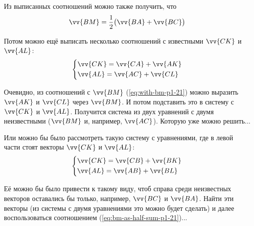 \documentclass[a4paper,12pt]{article}
\begin{document}
\begin{solution}
    Из выписанных соотношений можно также получить, что
    \begin{equation}
      \label{eq:bm-as-half-sum-p1-21}
      \vv{BM} = \frac{1}{2}\bigl(\vv{BA} + \vv{BC}\bigr)
    \end{equation}
    
    Потом можно ещё выписать несколько соотношений с известными $\vv{CK}$ и $\vv{AL}$:
    \begin{equation}
      \label{eq:with-ck-al-p1-21}
      \left\{
        \begin{aligned}
          &\vv{CK} = \vv{CA} + \vv{AK}\\
          &\vv{AL} = \vv{AC} + \vv{CL}
        \end{aligned}
      \right.
    \end{equation}
    
    Очевидно, из соотношений с $\vv{BM}$ (\ref{eq:with-bm-p1-21}) можно выразить $\vv{AK}$ и $\vv{CL}$ через $\vv{BM}$.
    И потом подставить это в систему с $\vv{CK}$ и $\vv{AL}$.
    Получится система из двух уравнений с двумя неизвестными ($\vv{BM}$ и, например, $\vv{AC}$).
    Которую уже можно решить...
    
    Или можно бы было рассмотреть такую систему с уравнениями, где в левой части стоят векторы $\vv{CK}$ и $\vv{AL}$:
    \[
      \label{eq:with-ck-al-p1-21}
      \left\{
        \begin{aligned}
          &\vv{CK} = \vv{CB} + \vv{BK}\\
          &\vv{AL} = \vv{AB} + \vv{BL}
        \end{aligned}
      \right.
    \]
    
    Её можно бы было привести к такому виду, чтоб справа среди неизвестных векторов оставались бы только, например, $\vv{BC}$ и $\vv{BA}$.
    Найти эти векторы (из системы с двумя уравнениями это можно будет сделать) и далее воспользоваться соотношением (\ref{eq:bm-as-half-sum-p1-21})...
    
    \begin{figure}[h]
      \centering
      
\end{figure}
\end{solution}
\end{document}
